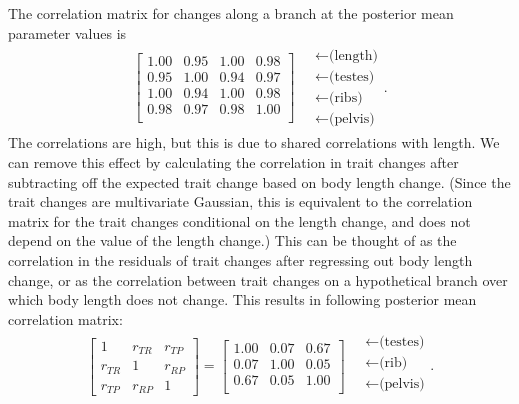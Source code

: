 \documentclass{article}
\begin{document}
The correlation matrix for changes along a branch at the posterior mean parameter values is 
\begin{align}
\begin{bmatrix}
   1.00 & 0.95 & 1.00 & 0.98 \\ 
   0.95 & 1.00 & 0.94 & 0.97 \\ 
   1.00 & 0.94 & 1.00 & 0.98 \\ 
   0.98 & 0.97 & 0.98 & 1.00 \\ 
 \end{bmatrix}
\quad \begin{matrix}
  \leftarrow \text{(length)} \\
  \leftarrow \text{(testes)} \\
  \leftarrow \text{(ribs)} \\
  \leftarrow \text{(pelvis)} 
\end{matrix} .
\end{align}
The correlations are high, but this is due to shared correlations with length.
We can remove this effect by calculating the correlation in trait changes
after subtracting off the expected trait change based on body length change.
(Since the trait changes are multivariate Gaussian, this is equivalent to the correlation matrix
for the trait changes conditional on the length change,
and does not depend on the value of the length change.)
This can be thought of as the correlation in the residuals of trait changes after regressing out body length change,
or as the correlation between trait changes on a hypothetical branch over which body length does not change.
This results in following posterior mean correlation matrix:
\begin{align}
\begin{bmatrix}
  1 & r_{TR} & r_{TP} \\ 
  r_{TR} & 1 & r_{RP} \\ 
  r_{TP} & r_{RP} & 1 
 \end{bmatrix}
 =
\begin{bmatrix}
  1.00 & 0.07 & 0.67 \\ 
  0.07 & 1.00 & 0.05 \\ 
  0.67 & 0.05 & 1.00 \\ 
 \end{bmatrix}
\quad \begin{matrix}
  \leftarrow \text{(testes)} \\
  \leftarrow \text{(rib)} \\
  \leftarrow \text{(pelvis)} \\
\end{matrix}  .
\end{align}
\end{document}
